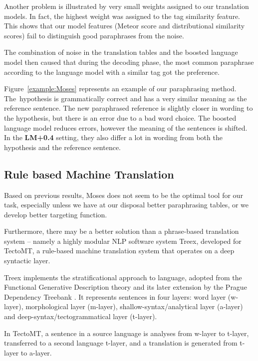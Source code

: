 \documentclass[11pt]{article}
\def\Fref#1{Figure~\ref{#1}}
\begin{document}
Another problem is illustrated by very small weights assigned to our 
translation models. In fact, the highest weight was assigned to the tag 
similarity feature. This shows that our model features (Meteor score and 
distributional similarity scores) fail to distinguish good paraphrases from the 
noise. 

The combination of noise in the translation tables and the boosted language
model then caused that during the decoding phase, the most common paraphrase
according to the language model with a similar tag got the preference. 

\Fref{example:Moses} represents an example of our paraphrasing method. The~hypothesis 
is grammatically correct and has a very similar meaning as the reference 
sentence. The new paraphrased reference is slightly closer in wording to the 
hypothesis, but there is an error due to a bad word choice. The boosted 
language model reduces errors, however the meaning of the sentences is shifted. 
In the \textbf{LM+0.4} setting, they also differ a lot in wording from both the 
hypothesis and the reference sentence.

\subsection{Rule based Machine Translation}
Based on previous results, Moses does not seem to be the optimal tool for our 
task, especially unless we have at our disposal better paraphrasing tables, or
we develop better targeting function. %

Furthermore, there may be a better solution than a phrase-based translation
system -- namely a highly modular NLP software system Treex, developed for 
TectoMT, a rule-based machine translation system that operates on a deep 
syntactic layer.

Treex implements the stratificational approach to language, adopted from the 
Functional Generative Description theory \cite{FGP} and its later extension by 
the Prague Dependency Treebank \cite{PDT3.0}. It represents sentences in four 
layers: word layer (w-layer), morphological layer (m-layer), 
shallow-syntax/analytical layer (a-layer) and deep-syntax/tectogrammatical 
layer (t-layer).

In TectoMT, a sentence in a source language is analyses from w-layer to 
t-layer, transferred to a second language t-layer, and a translation is 
generated from t-layer to a-layer.

\end{document}
